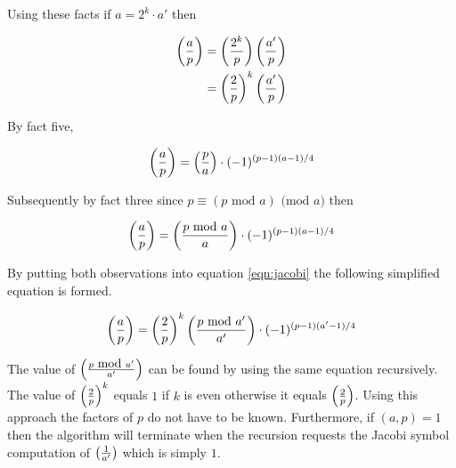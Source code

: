 \documentclass[b5paper]{book}
\begin{document}
Using these facts if $a = 2^k \cdot a'$ then

\begin{eqnarray}
\left ( { a \over p } \right ) = \left ( {{2^k} \over p } \right ) \left ( {a' \over p} \right ) \nonumber \\
                               = \left ( {2 \over p } \right )^k \left ( {a' \over p} \right ) 
\label{eqn:jacobi}
\end{eqnarray}

By fact five, 

\begin{equation}
\left ( { a \over p } \right ) = \left ( { p \over a } \right ) \cdot (-1)^{(p-1)(a-1)/4} 
\end{equation}

Subsequently by fact three since $p \equiv (p \mbox{ mod }a) \mbox{ (mod }a\mbox{)}$ then 

\begin{equation}
\left ( { a \over p } \right ) = \left ( { {p \mbox{ mod } a} \over a } \right ) \cdot (-1)^{(p-1)(a-1)/4} 
\end{equation}

By putting both observations into equation \ref{eqn:jacobi} the following simplified equation is formed.

\begin{equation}
\left ( { a \over p } \right ) = \left ( {2 \over p } \right )^k \left ( {{p\mbox{ mod }a'} \over a'} \right )  \cdot (-1)^{(p-1)(a'-1)/4} 
\end{equation}

The value of $\left ( {{p \mbox{ mod }a'} \over a'} \right )$ can be found by using the same equation recursively.  The value of 
$\left ( {2 \over p } \right )^k$ equals $1$ if $k$ is even otherwise it equals $\left ( {2 \over p } \right )$.  Using this approach the 
factors of $p$ do not have to be known.  Furthermore, if $(a, p) = 1$ then the algorithm will terminate when the recursion requests the 
Jacobi symbol computation of $\left ( {1 \over a'} \right )$ which is simply $1$.  
\end{document}

